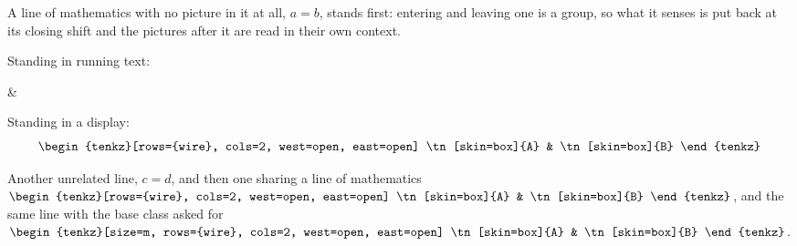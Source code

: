 \documentclass{article}
\begin{document}
\tenkzkernel
A line of mathematics with no picture in it at all, $a = b$, stands first:
entering and leaving one is a group, so what it senses is put back at its
closing shift and the pictures after it are read in their own context.

Standing in running text:
\begin{tenkz}[rows={wire}, cols=2, west=open, east=open]
   & 
\end{tenkz}

Standing in a display:
\[
  \begin{tenkz}[rows={wire}, cols=2, west=open, east=open]
    \tn[skin=box]{A} & \tn[skin=box]{B}
  \end{tenkz}
\]

Another unrelated line, $c = d$, and then one sharing a line of mathematics
$\begin{tenkz}[rows={wire}, cols=2,
  west=open, east=open]
  \tn[skin=box]{A} & \tn[skin=box]{B}
\end{tenkz}$, and the same line with the base class asked for
$\begin{tenkz}[size=m, rows={wire}, cols=2, west=open, east=open]
  \tn[skin=box]{A} & \tn[skin=box]{B}
\end{tenkz}$.
\end{document}
